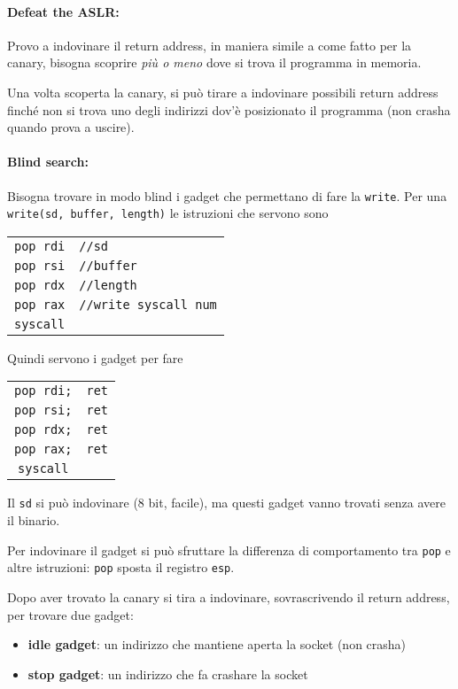 \paragraph{Defeat the ASLR:} Provo a indovinare il return address, in maniera simile a come fatto per la canary, bisogna scoprire \textit{più o meno} dove si trova il programma in memoria.

Una volta scoperta la canary, si può tirare a indovinare possibili return address finché non si trova uno degli indirizzi dov'è posizionato il programma (non crasha quando prova a uscire).

\paragraph{Blind search:} Bisogna trovare in modo blind i gadget che permettano di fare la \texttt{write}. Per una \texttt{write(sd, buffer, length)} le istruzioni che servono sono

\begin{tabular}{c l}
	\texttt{pop rdi} & \texttt{//sd} \\
	\texttt{pop rsi} & \texttt{//buffer} \\
	\texttt{pop rdx} & \texttt{//length} \\
	\texttt{pop rax} & \texttt{//write syscall num} \\
	\texttt{syscall} & \\
\end{tabular}

Quindi servono i gadget per fare

\begin{tabular}{c c}
	\texttt{pop rdi;} & \texttt{ret} \\
	\texttt{pop rsi;} & \texttt{ret} \\
	\texttt{pop rdx;} & \texttt{ret} \\
	\texttt{pop rax;} & \texttt{ret} \\
	\texttt{syscall} & \\
\end{tabular}

Il \texttt{sd} si può indovinare (8 bit, facile), ma questi gadget vanno trovati senza avere il binario. 

Per indovinare il gadget si può sfruttare la differenza di comportamento tra \texttt{pop} e altre istruzioni: \texttt{pop} sposta il registro \texttt{esp}.

Dopo aver trovato la canary si tira a indovinare, sovrascrivendo il return address, per trovare due gadget:
\begin{itemize}
	\item \textbf{idle gadget}: un indirizzo che mantiene aperta la socket (non crasha)
    
	\item \textbf{stop gadget}: un indirizzo che fa crashare la socket
\end{itemize}

